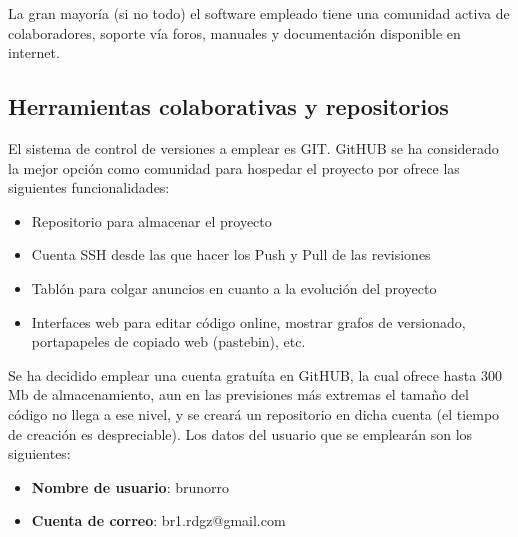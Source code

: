 La gran mayoría (si no todo) el software empleado tiene una comunidad activa de colaboradores, soporte vía foros, manuales y documentación disponible en internet. 
	

\subsection{Herramientas colaborativas y repositorios}
El sistema de control de versiones a emplear es GIT. GitHUB se ha considerado la mejor opción como comunidad para hospedar el proyecto por ofrece las siguientes funcionalidades:
\begin{itemize}
	\item{Repositorio para almacenar el proyecto}
	\item{Cuenta SSH desde las que hacer los Push y Pull de las revisiones}
	\item{Tablón para colgar anuncios en cuanto a la evolución del proyecto}
	\item{Interfaces web para editar código online, mostrar grafos de versionado, portapapeles de copiado web (pastebin), etc.}
\end{itemize}
Se ha decidido emplear una cuenta gratuíta en GitHUB, la cual ofrece hasta 300 Mb de almacenamiento, aun en las previsiones más extremas el tamaño del código no llega a ese nivel, y se creará un repositorio en dicha cuenta (el tiempo de creación es despreciable). Los datos del usuario que se emplearán son los siguientes:
\begin{itemize}
	\item{\textbf{Nombre de usuario}: brunorro}
	\item{\textbf{Cuenta de correo}: br1.rdgz@gmail.com}
\end{itemize}


